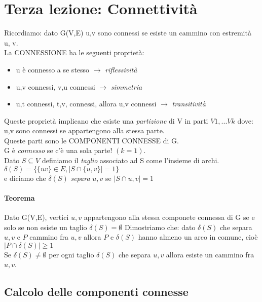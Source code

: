 \section{Terza lezione: Connettività}

Ricordiamo: dato G(V,E) u,v sono connessi se esiste un cammino con estremità u, v. \\
La CONNESSIONE ha le seguenti proprietà:
\begin{itemize}
\item u è connesso a se stesso \( \rightarrow \) \emph{riflessività}
\item u,v connessi, v,u connessi \( \rightarrow \) \emph{simmetria} 
\item u,t connessi, t,v, connessi, allora u,v connessi \( \rightarrow \) \emph{transitività}
\end{itemize}
Queste proprietà implicano che esiste una \emph{partizione} di V in parti \(V1,...Vk \) dove: 
u,v sono connessi se appartengono alla stessa parte. \\
Queste parti sono le COMPONENTI CONNESSE di G. \\
G è \emph{connesso} se c'è una sola parte! \((k=1)\). \\

\noindent
Dato \( S \subseteq V \) definiamo il \emph{taglio} associato ad S come l'insieme di archi. \\
\( \delta(S) = \{ \{uv\} \in E , \mid S \cap \{u, v\} \mid = 1\} \) \\
e diciamo che $\delta(S)$ \emph{separa} $u,v$ se \( \mid S \cap u,v \mid =1 \) \smallskip
\paragraph{Teorema} 
Dato G(V,E), vertici $u,v$ appartengono alla stessa componete connessa di G se e solo se non esiste un taglio $\delta(S) = \emptyset $
Dimostriamo che: dato $\delta(S)$ che separa $u,v$ e $P$ cammino fra $u,v$ allora $P$ e $\delta(S)$ hanno almeno un arco in comune, cioè \(\mid P \cap \delta(S) \mid \geq 1\)\\
Se $\delta(S) \neq \emptyset$ per ogni taglio $\delta(S)$ che separa $u,v$ allora esiste un cammino fra $u,v$. \\

\subsection{Calcolo delle componenti connesse}

